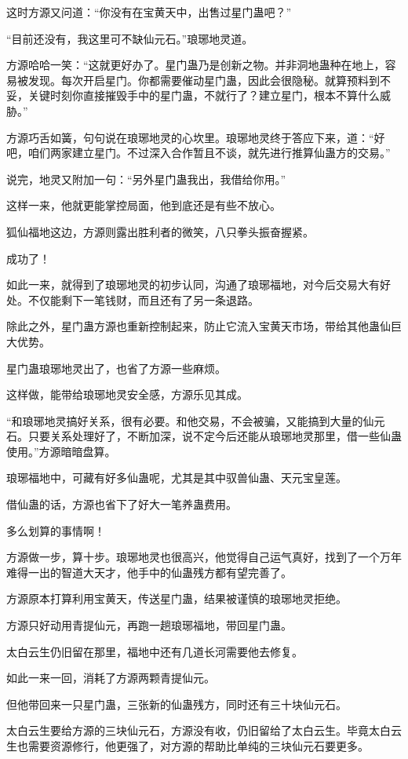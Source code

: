 \begin{this_body}
这时方源又问道：“你没有在宝黄天中，出售过星门蛊吧？”

“目前还没有，我这里可不缺仙元石。”琅琊地灵道。

方源哈哈一笑：“这就更好办了。星门蛊乃是创新之物。并非洞地蛊种在地上，容易被发现。每次开启星门。你都需要催动星门蛊，因此会很隐秘。就算预料到不妥，关键时刻你直接摧毁手中的星门蛊，不就行了？建立星门，根本不算什么威胁。”

方源巧舌如簧，句句说在琅琊地灵的心坎里。琅琊地灵终于答应下来，道：“好吧，咱们两家建立星门。不过深入合作暂且不谈，就先进行推算仙蛊方的交易。”

说完，地灵又附加一句：“另外星门蛊我出，我借给你用。”

这样一来，他就更能掌控局面，他到底还是有些不放心。

狐仙福地这边，方源则露出胜利者的微笑，八只拳头振奋握紧。

成功了！

如此一来，就得到了琅琊地灵的初步认同，沟通了琅琊福地，对今后交易大有好处。不仅能剩下一笔钱财，而且还有了另一条退路。

除此之外，星门蛊方源也重新控制起来，防止它流入宝黄天市场，带给其他蛊仙巨大优势。

星门蛊琅琊地灵出了，也省了方源一些麻烦。

这样做，能带给琅琊地灵安全感，方源乐见其成。

“和琅琊地灵搞好关系，很有必要。和他交易，不会被骗，又能搞到大量的仙元石。只要关系处理好了，不断加深，说不定今后还能从琅琊地灵那里，借一些仙蛊使用。”方源暗暗盘算。

琅琊福地中，可藏有好多仙蛊呢，尤其是其中驭兽仙蛊、天元宝皇莲。

借仙蛊的话，方源也省下了好大一笔养蛊费用。

多么划算的事情啊！

方源做一步，算十步。琅琊地灵也很高兴，他觉得自己运气真好，找到了一个万年难得一出的智道大天才，他手中的仙蛊残方都有望完善了。

方源原本打算利用宝黄天，传送星门蛊，结果被谨慎的琅琊地灵拒绝。

方源只好动用青提仙元，再跑一趟琅琊福地，带回星门蛊。

太白云生仍旧留在那里，福地中还有几道长河需要他去修复。

如此一来一回，消耗了方源两颗青提仙元。

但他带回来一只星门蛊，三张新的仙蛊残方，同时还有三十块仙元石。

太白云生要给方源的三块仙元石，方源没有收，仍旧留给了太白云生。毕竟太白云生也需要资源修行，他更强了，对方源的帮助比单纯的三块仙元石要更多。


\end{this_body}
